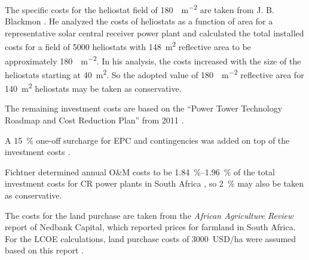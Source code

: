 The specific costs for the heliostat field of \SI{180}{\usd\per\square\metre} are taken from J. B. Blackmon \cite{Blackmon2012}. He analyzed the costs of heliostats as a function of area for a representative solar central receiver power plant and calculated the total installed costs for a field of \num{5000} heliostats with \SI{148}{\square\metre} reflective area to be approximately \SI{180}{\usd\per\square\metre}. In his analysis, the costs increased with the size of the heliostats starting at \SI{40}{\square\metre}. So the adopted value of \SI{180}{\usd\per\square\metre} reflective area for \SI{140}{\square\metre} heliostats may be taken as conservative.

The remaining investment costs are based on the \enquote{Power Tower Technology Roadmap and Cost Reduction Plan} from 2011 \cite{Kolb2011}.

A \SI{15}{\percent} one-off surcharge for EPC and contingencies was added on top of the investment costs \cite{Platzer2014}.

Fichtner determined annual O\&M costs to be \SIrange{1.84}{1.96}{\percent} of the total investment costs for CR power plants in South Africa \cite{Fichtner2010}, so \SI{2}{\percent} may also be taken as conservative.

The costs for the land purchase are taken from the \emph{African Agriculture Review} report of Nedbank Capital, which reported prices for farmland in South Africa. For the LCOE calculations, land purchase costs of \SI{3000}{USD/ha} were assumed based on this report \cite{Cassell2012}.


